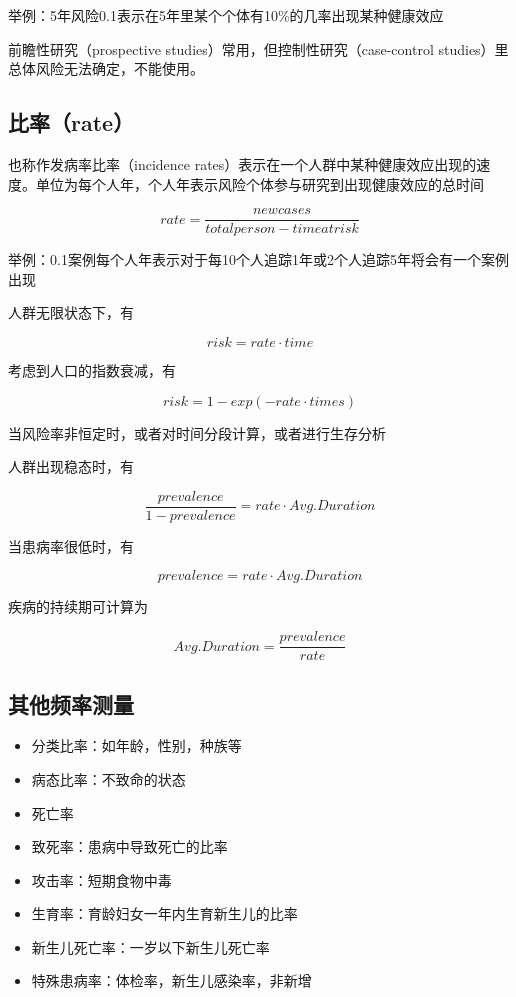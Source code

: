 \documentclass[
]{book}
\providecommand{\tightlist}{%
  \setlength{\itemsep}{0pt}\setlength{\parskip}{0pt}}
\begin{document}
举例：5年风险0.1表示在5年里某个个体有10\%的几率出现某种健康效应

前瞻性研究（prospective studies）常用，但控制性研究（case-control studies）里总体风险无法确定，不能使用。

\hypertarget{ux6bd4ux7387rate}{%
\subsection{比率（rate）}\label{ux6bd4ux7387rate}}

也称作发病率比率（incidence rates）表示在一个人群中某种健康效应出现的速度。单位为每个人年，个人年表示风险个体参与研究到出现健康效应的总时间

\[rate = \frac{new cases}{total person-time at risk}\]

举例：0.1案例每个人年表示对于每10个人追踪1年或2个人追踪5年将会有一个案例出现

人群无限状态下，有

\[risk = rate \cdot time\]

考虑到人口的指数衰减，有

\[risk = 1 - exp(- rate \cdot times)\]

当风险率非恒定时，或者对时间分段计算，或者进行生存分析

人群出现稳态时，有

\[\frac{prevalence}{1-prevalence} = rate \cdot Avg.Duration\]

当患病率很低时，有

\[prevalence = rate \cdot Avg.Duration\]

疾病的持续期可计算为

\[Avg.Duration = \frac{prevalence}{rate}\]

\hypertarget{ux5176ux4ed6ux9891ux7387ux6d4bux91cf}{%
\subsection{其他频率测量}\label{ux5176ux4ed6ux9891ux7387ux6d4bux91cf}}

\begin{itemize}
\tightlist
\item
  分类比率：如年龄，性别，种族等
\item
  病态比率：不致命的状态
\item
  死亡率
\item
  致死率：患病中导致死亡的比率
\item
  攻击率：短期食物中毒
\item
  生育率：育龄妇女一年内生育新生儿的比率
\item
  新生儿死亡率：一岁以下新生儿死亡率
\item
  特殊患病率：体检率，新生儿感染率，非新增
\end{itemize}
\end{document}
